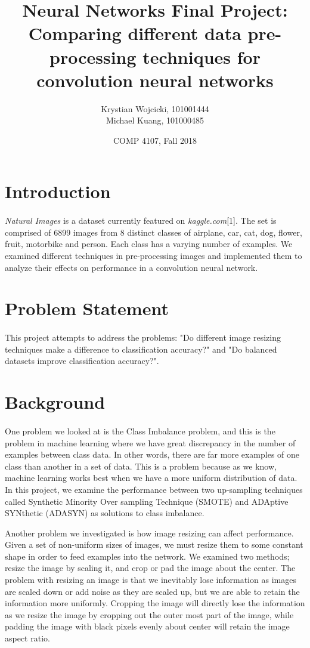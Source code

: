 \documentclass{article}
\title{Neural Networks Final Project: \\
	\large{Comparing different data pre-processing techniques for convolution neural networks}}
\author{Krystian Wojcicki, 101001444 \\ Michael Kuang, 101000485}
\date{COMP 4107, Fall 2018}
\begin{document}
\maketitle

\section{Introduction}
\paragraph{}
{\em Natural Images} is a dataset currently featured on {\em kaggle.com}[1]. The set is comprised of 6899 images from 8 distinct classes of airplane, car, cat, dog, flower, fruit, motorbike and person. Each class has a varying number of examples. We examined different techniques in pre-processing images and implemented them to analyze their effects on performance in a convolution neural network. 

\section{Problem Statement}
\paragraph{}
This project attempts to address the problems: "Do different image resizing techniques make a difference to classification accuracy?" and "Do balanced datasets improve classification accuracy?".

\section{Background}
\paragraph{}
One problem we looked at is the Class Imbalance problem, and this is the problem in machine learning where we have great discrepancy in the number of examples between class data. In other words, there are far more examples of one class than another in a set of data. This is a problem because as we know, machine learning works best when we have a more uniform distribution of data. In this project, we examine the performance between two up-sampling techniques called Synthetic Minority Over sampling Technique (SMOTE) and ADAptive SYNthetic (ADASYN) as solutions to class imbalance. 
\par
Another problem we investigated is how image resizing can affect performance. Given a set of non-uniform sizes of images, we must resize them to some constant shape in order to feed examples into the network. We examined two methods; resize the image by scaling it, and crop or pad the image about the center. The problem with resizing an image is that we inevitably lose information as images are scaled down or add noise as they are scaled up, but we are able to retain the information more uniformly. Cropping the image will directly lose the information as we resize the image by cropping out the outer most part of the image, while padding the image with black pixels evenly about center will retain the image aspect ratio.
\end{document}
